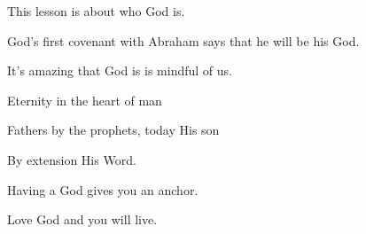 \begin{discussion}

This lesson is about who God is.

 God's first covenant with Abraham says that he will be his God.


	 It's amazing that God is is mindful of us.


	 Eternity in the heart of man

   Fathers by the prophets, today His son
	
	By extension His Word.


	 Having a God gives you an anchor. 
	
	 Love God and you will live.

\end{discussion}